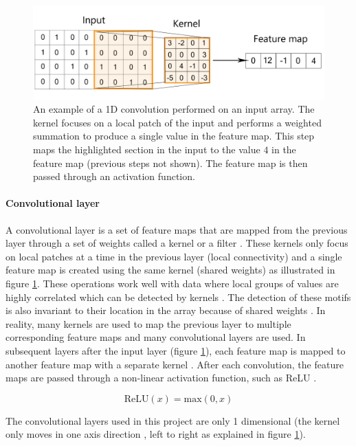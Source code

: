 \documentclass{article}
\begin{document}
\begin{figure}[H]
    \centering
    \includegraphics[width=0.7\linewidth]{images/kernel.png}
    \caption{An example of a 1D convolution performed on an input array. The kernel focuses on a local patch of the input and performs a weighted summation to produce a single value in the feature map. This step maps the highlighted section in the input to the value $4$ in the feature map (previous steps not shown). The feature map is then passed through an activation function.}
    \label{fig:kernel}
\end{figure}

\paragraph{Convolutional layer} A convolutional layer is a set of feature maps that are mapped from the previous layer through a set of weights called a kernel or a filter \cite{LeCun2015}. These kernels only focus on local patches at a time in the previous layer (local connectivity) and a single feature map is created using the same kernel (shared weights) \cite{LeCun2015} as illustrated in figure \ref{fig:kernel}. These operations work well with data where local groups of values are highly correlated which can be detected by kernels \cite{LeCun2015}. The detection of these motifs is also invariant to their location in the array because of shared weights \cite{LeCun2015}. In reality, many kernels are used to map the previous layer to multiple corresponding feature maps and many convolutional layers are used. In subsequent layers after the input layer (figure \ref{fig:kernel}), each feature map is mapped to another feature map with a separate kernel \cite{LeCun2015}. After each convolution, the feature maps are passed through a non-linear activation function, such as ReLU \cite{LeCun2015, pytorch2019}.

$$
    \textrm{ReLU}(x) = \textrm{max}(0,x)
$$

The convolutional layers used in this project are only 1 dimensional (the kernel only moves in one axis direction \cite{pytorch2019}, left to right as explained in figure \ref{fig:kernel}).
\end{document}
